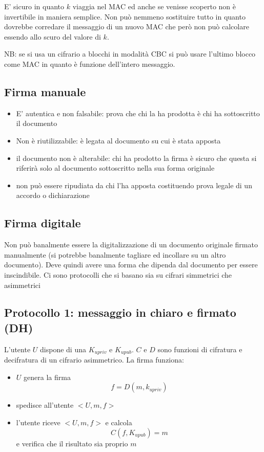E' sicuro in quanto $k$ viaggia nel MAC ed anche se venisse scoperto non è invertibile in maniera semplice.
Non può nemmeno sostituire tutto in quanto dovrebbe corredare il messaggio di un nuovo MAC che però non può calcolare essendo allo scuro del valore di $k$.

NB: se si usa un cifrario a blocchi in modalità CBC si può usare l'ultimo blocco come MAC in quanto è funzione dell'intero messaggio.

\subsection{Firma manuale}
\begin{itemize}
    \item E' autentica e non falsabile: prova che chi la ha prodotta è chi ha sottoscritto il documento
    \item Non è riutilizzabile: è legata al documento su cui è stata apposta
    \item il documento non è alterabile: chi ha prodotto la firma è sicuro che questa si riferirà solo al documento sottoscritto nella sua forma originale
    \item non può essere ripudiata da chi l'ha apposta costituendo prova legale di un accordo o dichiarazione
\end{itemize}

\subsection{Firma digitale}
Non può banalmente essere la digitalizzazione di un documento originale firmato manualmente (si potrebbe banalmente tagliare ed incollare su un altro documento).
Deve quindi avere una forma che dipenda dal documento per essere inscindibile.
Ci sono protocolli che si basano sia su cifrari simmetrici che asimmetrici

\subsection{Protocollo 1: messaggio in chiaro e firmato (DH)}
L'utente $U$ dispone di una $K_{upriv}$ e $K_{upub}$. $C$ e $D$ sono funzioni di cifratura e decifratura di un cifrario asimmetrico.
La firma funziona:
\begin{itemize}
    \item $U$ genera la firma 
    $$f = D(m, k_{upriv})$$
    \item spedisce all'utente $<U,m,f>$
    \item l'utente riceve $<U,m,f>$ e calcola 
    $$C(f, K_{upub}) = m$$
    e verifica che il risultato sia proprio $m$
\end{itemize}


